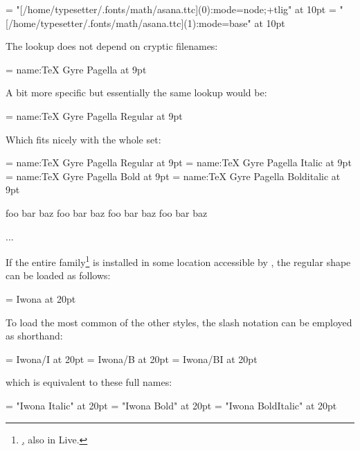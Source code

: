 \beginlisting
  \font \asanamain = "[/home/typesetter/.fonts/math/asana.ttc](0):mode=node;+tlig" at 10pt
  \font \asanamath = "[/home/typesetter/.fonts/math/asana.ttc](1):mode=base" at 10pt
\endlisting

\endsubsubsection


The  lookup does not depend on cryptic filenames:

\beginlisting
  \font \pagellaregular = {name:TeX Gyre Pagella} at 9pt
\endlisting

A bit more specific but essentially the same lookup would be:

\beginlisting
  \font \pagellaregular = {name:TeX Gyre Pagella Regular} at 9pt
\endlisting

\noindent
Which fits nicely with the whole set:

\beginlisting
  \font\pagellaregular    = {name:TeX Gyre Pagella Regular}    at 9pt
  \font\pagellaitalic     = {name:TeX Gyre Pagella Italic}     at 9pt
  \font\pagellabold       = {name:TeX Gyre Pagella Bold}       at 9pt
  \font\pagellabolditalic = {name:TeX Gyre Pagella Bolditalic} at 9pt

  {\pagellaregular     foo bar baz\endgraf}
  {\pagellaitalic      foo bar baz\endgraf}
  {\pagellabold        foo bar baz\endgraf}
  {\pagellabolditalic  foo bar baz\endgraf}

  ...
\endlisting

\endsubsubsection


If the entire  family\footnote{%
  \hyperlink {http://jmn.pl/kurier-i-iwona/},
  also in \TEX Live.
}
is installed in some location accessible by ,
the regular shape can be loaded as follows:

\beginlisting
  \font \iwona = Iwona at 20pt
\endlisting

\noindent
To load the most common of the other styles, the slash notation can
be employed as shorthand:

\beginlisting
  \font \iwonaitalic     = Iwona/I    at 20pt
  \font \iwonabold       = Iwona/B    at 20pt
  \font \iwonabolditalic = Iwona/BI   at 20pt
\endlisting

\noindent
which is equivalent to these full names:

\beginlisting
  \font \iwonaitalic     = "Iwona Italic"       at 20pt
  \font \iwonabold       = "Iwona Bold"         at 20pt
  \font \iwonabolditalic = "Iwona BoldItalic"   at 20pt
\endlisting

